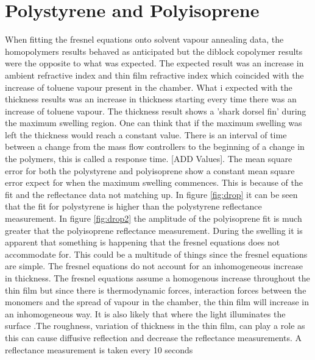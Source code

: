 \documentclass[MasterThesisMain.tex]{subfiles}
\begin{document}
\section{Polystyrene and Polyisoprene}
When fitting the fresnel equations onto solvent vapour annealing data, the homopolymers results behaved as anticipated but the diblock copolymer results were the opposite to what was expected. The expected result was an increase in ambient refractive index and thin film refractive index which coincided with the increase of toluene vapour present in the chamber. What i expected with the thickness results was an increase in thickness starting every time there was an increase of toluene vapour. The thickness result shows a 'shark dorsel fin' during the maximum swelling region. One can think that if the maximum swelling was left the thickness would reach a constant value. There is an interval of time between a change from the mass flow controllers to the beginning of a change in the polymers, this is called a response time. [ADD Values]. The mean square error for both the polystyrene and polyisoprene show a constant mean square error expect for when the maximum swelling commences. This is because of the fit and the reflectance data not matching up. In figure \ref{fig:drop} it can be seen that the fit for polystyrene is higher than the polystyrene reflectance measurement. In figure \ref{fig:drop2} the amplitude of the polyisoprene fit is much greater that the polyisoprene reflectance measurement. During the swelling it is apparent that something is happening that the fresnel equations does not accommodate for. This could be a multitude of things since the fresnel equations are simple. The fresnel equations do not account for an inhomogeneous increase in thickness. The fresnel equations assume a homogenous increase throughout the thin film but since there is thermodynamic forces, interaction forces between the monomers and the spread of vapour in the chamber, the thin film will increase in an inhomogeneous way. It is also likely that where the light illuminates the surface .The roughness, variation of thickness in the thin film, can play a role as this can cause diffusive reflection and decrease the reflectance measurements. A reflectance measurement is taken every 10 seconds   
\end{document}
